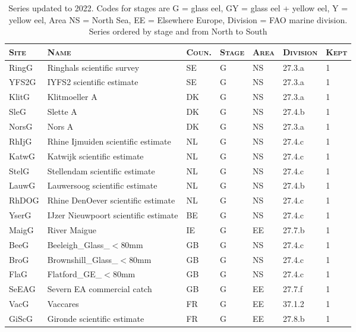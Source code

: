 \begin{table}[htbp]
\centering
\caption{Series updated to 2022. Codes for stages are G = glass eel, GY = glass eel + yellow eel, Y = yellow eel, Area NS = North Sea, EE = Elsewhere Europe, Division = FAO marine division. Series ordered by stage and from North to South} 
\label{table_seriesCY}
\begin{tabularx}{\textwidth}{p{1.3cm}p{6.5cm}p{1cm}p{1cm}p{1cm}p{1cm}p{1.4cm}}
  \hline
\scshape{Site} & \scshape{Name} & \scshape{Coun.} & \scshape{Stage} & \scshape{Area} & \scshape{Division} & \scshape{Kept} \\ 
  \hline
RingG & Ringhals scientific survey & SE & G & NS & 27.3.a &   1 \\ 
  YFS2G & IYFS2 scientific estimate & SE & G & NS & 27.3.a &   1 \\ 
  KlitG & Klitmoeller A & DK & G & NS & 27.3.a &   1 \\ 
  SleG & Slette A & DK & G & NS & 27.4.b &   1 \\ 
  NorsG & Nors A & DK & G & NS & 27.3.a &   1 \\ 
  RhIjG & Rhine Ijmuiden scientific estimate & NL & G & NS & 27.4.c &   1 \\ 
  KatwG & Katwijk scientific estimate & NL & G & NS & 27.4.c &   1 \\ 
  StelG & Stellendam scientific estimate & NL & G & NS & 27.4.c &   1 \\ 
  LauwG & Lauwersoog scientific estimate & NL & G & NS & 27.4.b &   1 \\ 
  RhDOG & Rhine DenOever scientific estimate & NL & G & NS & 27.4.c &   1 \\ 
  YserG & IJzer Nieuwpoort scientific estimate & BE & G & NS & 27.4.c &   1 \\ 
  MaigG & River Maigue & IE & G & EE & 27.7.b &   1 \\ 
  BeeG & Beeleigh\_Glass\_$<$80mm & GB & G & NS & 27.4.c &   1 \\ 
  BroG & Brownshill\_Glass\_$<$80mm & GB & G & NS & 27.4.c &   1 \\ 
  FlaG & Flatford\_GE\_$<$80mm & GB & G & NS & 27.4.c &   1 \\ 
  SeEAG & Severn EA commercial catch & GB & G & EE & 27.7.f &   1 \\ 
  VacG & Vaccares & FR & G & EE & 37.1.2 &   1 \\ 
  GiScG & Gironde scientific estimate & FR & G & EE & 27.8.b &   1 \\ 

\end{tabularx}
\end{table}
